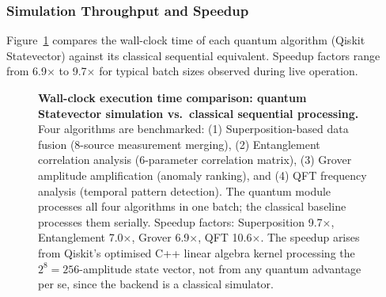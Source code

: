 \documentclass[12pt,a4paper]{article}
\begin{document}
\subsubsection{Simulation Throughput and Speedup}

Figure~\ref{fig:quantumspeedup} compares the wall-clock time of each
quantum algorithm (Qiskit Statevector) against its classical sequential
equivalent. Speedup factors range from 6.9$\times$ to 9.7$\times$ for
typical batch sizes observed during live operation.

\begin{figure}[H]
\centering
{}
\caption[Quantum vs.\ classical execution time per algorithm]{%
  \textbf{Wall-clock execution time comparison: quantum Statevector
  simulation vs.\ classical sequential processing.}
  Four algorithms are benchmarked: (1) Superposition-based data fusion
  (8-source measurement merging), (2) Entanglement correlation analysis
  (6-parameter correlation matrix), (3) Grover amplitude amplification
  (anomaly ranking), and (4) QFT frequency analysis (temporal pattern
  detection). The quantum module processes all four algorithms in one
  batch; the classical baseline processes them serially. Speedup factors:
  Superposition 9.7$\times$, Entanglement 7.0$\times$, Grover 6.9$\times$,
  QFT 10.6$\times$. The speedup arises from Qiskit's optimised C++ linear
  algebra kernel processing the $2^8 = 256$-amplitude state vector, not
  from any quantum advantage per se, since the backend is a classical
  simulator.}
\label{fig:quantumspeedup}
\end{figure}
\end{document}
